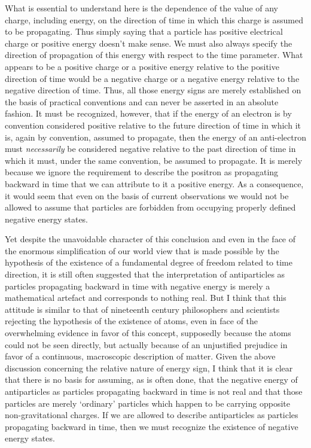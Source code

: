 \documentclass[notitlepage,12pt]{report}
\begin{document}
What is essential to understand here is the dependence of the value of any charge, including energy, on the direction of time in which this charge is assumed to be propagating. Thus simply saying that a particle has positive electrical charge or positive energy doesn't make sense. We must also always specify the direction of propagation of this energy with respect to the time parameter. What appears to be a positive charge or a positive energy relative to the positive direction of time would be a negative charge or a negative energy relative to the negative direction of time. Thus, all those energy signs are merely established on the basis of practical conventions and can never be asserted in an absolute fashion. It must be recognized, however, that if the energy of an electron is by convention considered positive relative to the future direction of time in which it is, again by convention, assumed to propagate, then the energy of an anti-electron must \textit{necessarily} be considered negative relative to the past direction of time in which it must, under the same convention, be assumed to propagate. It is merely because we ignore the requirement to describe the positron as propagating backward in time that we can attribute to it a positive energy. As a consequence, it would seem that even on the basis of current observations we would not be allowed to assume that particles are forbidden from occupying properly defined negative energy states.

Yet despite the unavoidable character of this conclusion and even in the face of the enormous simplification of our world view that is made possible by the hypothesis of the existence of a fundamental degree of freedom related to time direction, it is still often suggested that the interpretation of antiparticles as particles propagating backward in time with negative energy is merely a mathematical artefact and corresponds to nothing real. But I think that this attitude is similar to that of nineteenth century philosophers and scientists rejecting the hypothesis of the existence of atoms, even in face of the overwhelming evidence in favor of this concept, supposedly because the atoms could not be seen directly, but actually because of an unjustified prejudice in favor of a continuous, macroscopic description of matter. Given the above discussion concerning the relative nature of energy sign, I think that it is clear that there is no basis for assuming, as is often done, that the negative energy of antiparticles as particles propagating backward in time is not real and that those particles are merely `ordinary' particles which happen to be carrying opposite non-gravitational charges. If we are allowed to describe antiparticles as particles propagating backward in time, then we must recognize the existence of negative energy states.
\end{document}

